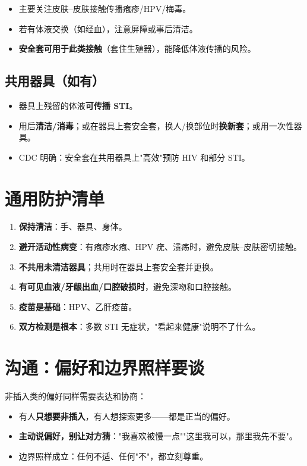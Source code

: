 \documentclass[12pt,UTF8,openany]{ctexbook}
\begin{document}
\begin{itemize}[leftmargin=2em]
  \item 主要关注皮肤--皮肤接触传播疱疹/HPV/梅毒。
  \item 若有体液交换（如经血），注意屏障或事后清洁。
  \item \textbf{安全套可用于此类接触}（套住生殖器），能降低体液传播的风险。
\end{itemize}

\subsection*{共用器具（如有）}

\begin{itemize}[leftmargin=2em]
  \item 器具上残留的体液\textbf{可传播 STI}。
  \item 用后\textbf{清洁/消毒}；或在器具上套安全套，换人/换部位时\textbf{换新套}；或用一次性器具。
  \item CDC 明确：安全套在共用器具上"高效"预防 HIV 和部分 STI。
\end{itemize}

\section{通用防护清单}

\begin{enumerate}[leftmargin=2em,itemsep=0.3em]
  \item \textbf{保持清洁}：手、器具、身体。
  \item \textbf{避开活动性病变}：有疱疹水疱、HPV 疣、溃疡时，避免皮肤--皮肤密切接触。
  \item \textbf{不共用未清洁器具}；共用时在器具上套安全套并更换。
  \item \textbf{有可见血液/牙龈出血/口腔破损时}，避免深吻和口腔接触。
  \item \textbf{疫苗是基础}：HPV、乙肝疫苗。
  \item \textbf{双方检测是根本}：多数 STI 无症状，"看起来健康"说明不了什么。
\end{enumerate}

\section{沟通：偏好和边界照样要谈}

非插入类的偏好同样需要表达和协商：

\begin{itemize}[leftmargin=2em]
  \item 有人\textbf{只想要非插入}，有人想探索更多——都是正当的偏好。
  \item \textbf{主动说偏好，别让对方猜}："我喜欢被慢一点""这里我可以，那里我先不要"。
  \item 边界照样成立：任何不适、任何"不"，都立刻尊重。
\end{itemize}
\end{document}
